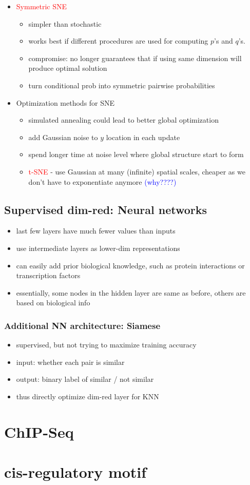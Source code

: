 \documentclass[font=12pt]{article}
\begin{document}
\begin{itemize}
\begin{itemize}
			\end{itemize}
		\item \textcolor{red}{Symmetric SNE}
			\begin{itemize}
				\item simpler than stochastic
				\item works best if different procedures are used for computing $p$'s and  $q$'s.
				\item compromise: no longer guarantees that if using same dimension will produce optimal solution
				\item turn conditional prob into symmetric pairwise probabilities
			\end{itemize}
		\item Optimization methods for SNE
			\begin{itemize}
				\item simulated annealing could lead to better global optimization
				\item add Gaussian noise to $y$ location in each update
				\item spend longer time at noise level where global structure start to form
				\item \textcolor{red}{t-SNE} - use Gaussian at many (infinite) spatial scales, cheaper as we don't have to exponentiate anymore \textcolor{blue}{(why????)} 
			\end{itemize}
				\end{itemize}
\subsection{Supervised dim-red: Neural networks}
\begin{itemize}
	\item last few layers have much fewer values than inputs
	\item use intermediate layers as lower-dim representations
	\item can easily add prior biological knowledge, such as protein interactions or transcription factors
	\item essentially, some nodes in the hidden layer are same as before, others are based on biological info
\end{itemize}
\subsubsection{Additional NN architecture: Siamese}
\begin{itemize}
	\item supervised, but not trying to maximize training accuracy
	\item input: whether each pair is similar
	\item output: binary label of similar / not similar
	\item thus directly optimize dim-red layer for KNN
\end{itemize}

\section{ChIP-Seq}

\section{cis-regulatory motif}
\end{document}

